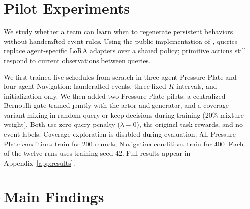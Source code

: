 \documentclass{article}
\begin{document}

\printAffiliationsAndNotice{}

\section{Pilot Experiments}

We study whether a team can learn when to regenerate persistent behaviors without handcrafted event rules. Using the public implementation of \citet{buchi2026events}, queries replace agent-specific LoRA adapters over a shared policy; primitive actions still respond to current observations between queries.

We first trained five schedules from scratch in three-agent Pressure Plate and four-agent Navigation: handcrafted events, three fixed $K$ intervals, and initialization only. We then added two Pressure Plate pilots: a centralized Bernoulli gate trained jointly with the actor and generator, and a coverage variant mixing in random query-or-keep decisions during training (20\% mixture weight). Both use zero query penalty ($\lambda=0$), the original task rewards, and no event labels. Coverage exploration is disabled during evaluation. All Pressure Plate conditions train for 200 rounds; Navigation conditions train for 400. Each of the twelve runs uses training seed 42. Full results appear in Appendix~\ref{app:results}.

\section{Main Findings}
\end{document}

